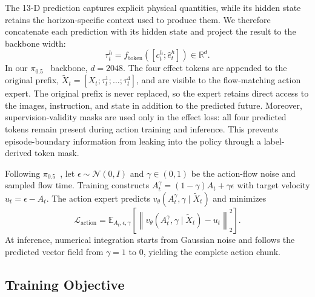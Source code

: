 \documentclass[letterpaper,10pt,conference]{ieeeconf}
\newcommand{\pihalf}{\ensuremath{\pi_{0.5}}}
\begin{document}
The 13-D prediction captures explicit physical quantities, while its hidden state retains the horizon-specific context used to produce them.
We therefore concatenate each prediction with its hidden state and project the result to the backbone width:
\begin{equation}
\tau_t^h=f_{\mathrm{token}}([c_t^h;\hat e_t^h])\in\mathbb{R}^{d}.
\label{eq:token}
\end{equation}
In our \pihalf{}~\cite{pi05} backbone, $d=2048$.
The four effect tokens are appended to the original prefix, $\widetilde{X}_t=[X_t;\tau_t^1;\ldots;\tau_t^4]$, and are visible to the flow-matching action expert.
The original prefix is never replaced, so the expert retains direct access to the images, instruction, and state in addition to the predicted future.
Moreover, supervision-validity masks are used only in the effect loss: all four predicted tokens remain present during action training and inference.
This prevents episode-boundary information from leaking into the policy through a label-derived token mask.

Following \pihalf{}~\cite{pi05}, let $\epsilon\sim\mathcal{N}(0,I)$ and $\gamma\in(0,1)$ be the action-flow noise and sampled flow time.
Training constructs $A_t^{\gamma}=(1-\gamma)A_t+\gamma\epsilon$ with target velocity $u_t=\epsilon-A_t$.
The action expert predicts $v_{\theta}(A_t^{\gamma},\gamma\mid\widetilde X_t)$ and minimizes
\begin{equation}
\mathcal{L}_{\mathrm{action}}=
\mathbb{E}_{A_t,\epsilon,\gamma}
\left[\left\|v_{\theta}(A_t^{\gamma},\gamma\mid\widetilde X_t)-u_t
\right\|_2^2\right].
\label{eq:action_flow}
\end{equation}
At inference, numerical integration starts from Gaussian noise and follows the predicted vector field from $\gamma=1$ to $0$, yielding the complete action chunk.

\subsection{Training Objective}
\end{document}

